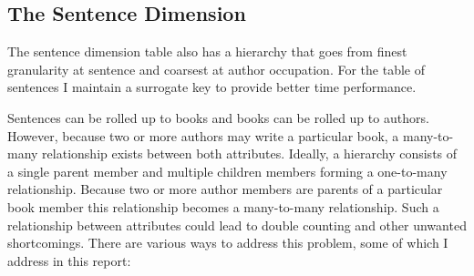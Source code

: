 
\subsection{The Sentence Dimension} %
\label{sub:the_sentence_dimension}

The sentence dimension table also has a hierarchy that goes from finest granularity at sentence and coarsest at author occupation. For the table of sentences I
maintain a surrogate key to provide better time performance.

Sentences can be rolled up to books and books can be rolled up to authors. However, because two or more authors may write a particular book, a many-to-many
relationship exists between both attributes. Ideally, a hierarchy consists of a single parent member and multiple children members forming a one-to-many
relationship. Because two or more author members are parents of a particular book member this relationship becomes a many-to-many relationship. Such a
relationship between attributes could lead to double counting and other unwanted shortcomings. There are various ways to address this problem, some of which I
address in this report:

